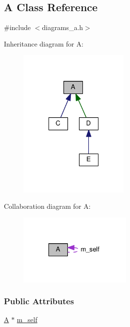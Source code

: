 \hypertarget{class_a}{}\subsection{A Class Reference}
\label{class_a}


{\ttfamily \#include $<$diagrams\+\_\+a.\+h$>$}



Inheritance diagram for A\+:
\nopagebreak
\begin{figure}[H]
\begin{center}
\leavevmode
\includegraphics[width=155pt]{class_a__inherit__graph}
\end{center}
\end{figure}


Collaboration diagram for A\+:
\nopagebreak
\begin{figure}[H]
\begin{center}
\leavevmode
\includegraphics[width=159pt]{class_a__coll__graph}
\end{center}
\end{figure}
\subsubsection*{Public Attributes}
\begin{DoxyCompactItemize}
\item 
\hyperlink{class_a}{A} $\ast$ \hyperlink{class_a_a086d3a4efc697dba0601b9fef3d082ad}{m\+\_\+self}
\end{DoxyCompactItemize}


